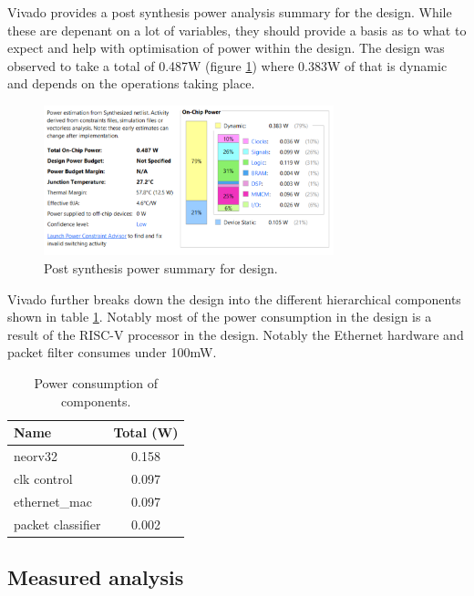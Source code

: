 Vivado provides a post synthesis power analysis summary for the design. While these are depenant on a lot of variables, they should provide a basis as to what to expect and help with optimisation of power within the design. The design was observed to take a total of 0.487W (figure \ref{fig:post_synth_power_summary}) where 0.383W of that is dynamic and depends on the operations taking place. 

\begin{figure}[h]
    \centering
    \includegraphics[width=0.75\textwidth]{Images/power_summary.png}
    \caption[Post synthesis power summary for design]{Post synthesis power summary for design.}
    \label{fig:post_synth_power_summary}
\end{figure}


Vivado further breaks down the design into the different hierarchical components shown in table \ref{tab:power_consumption}. Notably most of the power consumption in the design is a result of the RISC-V processor in the design. Notably the Ethernet hardware and packet filter consumes under 100mW. 

\begin{table}
    \centering
    \caption{Power consumption of components.}
    \begin{tabular}{|l|c|}
        \hline
        \textbf{Name} & \textbf{Total (W)} \\
        \hline
        neorv32 & 0.158 \\
        clk control & 0.097 \\
        ethernet\_mac & 0.097 \\
        packet classifier & 0.002 \\
        \hline
    \end{tabular}
    \label{tab:power_consumption}
\end{table}




\subsection{Measured analysis}

